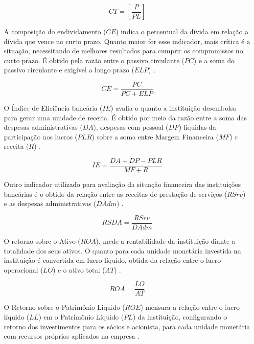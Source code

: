 \documentclass[
  12pt,
  12pt,
  openright,
  oneside,
  a4paper,
  chapter=TITLE,
  section=TITLE,
  subsection=TITLE,
  subsubsection=TITLE,
  english,
  portugues,
  sumario=tradicional]{abntex2}
\begin{document}
\begin{equation}
CT = [\frac{P}{PL}]
\end{equation}

A composição do endividamento (\(CE\)) indica o percentual da dívida em relação a dívida que vence no curto prazo. Quanto maior for esse indicador, mais crítica é a situação, necessitando de melhores resultados para cumprir os compromissos no curto prazo. É obtido pela razão entre o passivo circulante (\(PC\)) e a soma do passivo circulante e exigível a longo prazo (\(ELP\)) \cite{assaf:2020}.

\begin{equation}
CE = \frac{PC}{PC + ELP}
\end{equation}

O Índice de Eficiência bancária (\(IE\)) avalia o quanto a instituição desembolsa para gerar uma unidade de receita. É obtido por meio da razão entre a soma das despesas administrativas (\(DA\)), despesas com pessoal (\(DP\)) líquidas da participação nos lucros (\(PLR\)) sobre a soma entre Margem Financeira (\(MF\)) e receita (\(R\)) \cite{timotio:2018}.

\begin{equation}
IE = \frac{DA + DP - PLR}{MF + R} 
\end{equation}

Outro indicador utilizado para avaliação da situação financeira das instituições bancárias é o obtido da relação entre as receitas de prestação de serviços (\(RSrv\)) e as despesas administrativas (\(DAdm\)) \cite{dantas:2012}.

\begin{equation}
RSDA = \frac{RSrv_{}}{DAdm{}}
\end{equation}

O retorno sobre o Ativo (\(ROA\)), mede a rentabilidade da instituição diante a totalidade dos seus ativos. O quanto para cada unidade monetária investida na instituição é convertida em lucro líquido, obtida da relação entre o lucro operacional (\(LO\)) e o ativo total (\(AT\)) \cite{assaf:2020}.

\begin{equation}
ROA = \frac{LO}{AT}
\end{equation}

O Retorno sobre o Patrimônio Liquido (\(ROE\)) mensura a relação entre o lucro líquido (\(LL\)) em o Patrimônio Líquido (\(PL\)) da instituição, configurando o retorno dos investimentos para os sócios e acionista, para cada unidade monetária com recursos próprios aplicados na empresa \cite{assaf:2020}.
\end{document}
